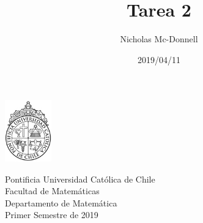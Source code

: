 

\title{Tarea 2}
\author{Nicholas Mc-Donnell}
\date{2019/04/11}



\begin{minipage}{2.5cm}
    \includegraphics[width=2cm]{../../figures/logo1.jpg}
\end{minipage}
\begin{minipage}{13cm}
    \begin{flushleft}
        \raggedright
        {
            \noindent
            {\sc Pontificia Universidad Católica de Chile\\
                Facultad de Matemáticas\\
                Departamento de Matemática} \smallskip \\
            Primer Semestre de 2019\\
        }
    \end{flushleft}
\end{minipage}

